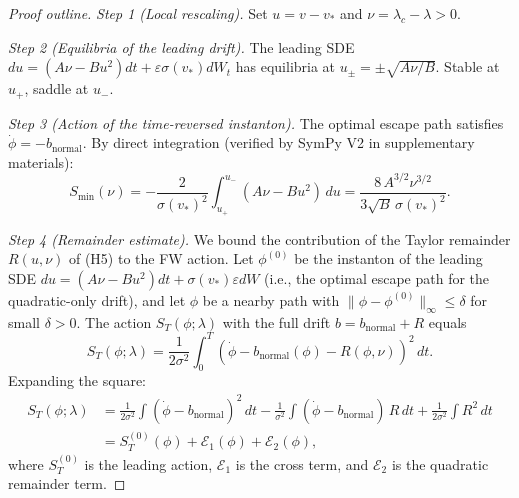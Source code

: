 \documentclass[11pt,a4paper]{article}
\theoremstyle{plain}
\theoremstyle{definition}
\newcommand{\eps}{\varepsilon}
\begin{document}
\begin{proof}[Proof outline]
\textit{Step 1 (Local rescaling).} Set $u = v - v_*$ and $\nu = \lambda_c - \lambda > 0$.

\textit{Step 2 (Equilibria of the leading drift).} The leading SDE $du = (A\nu - Bu^2)dt + \varepsilon\sigma(v_*)dW_t$ has equilibria at $u_\pm = \pm\sqrt{A\nu/B}$. Stable at $u_+$, saddle at $u_-$.

\textit{Step 3 (Action of the time-reversed instanton).} The optimal escape path satisfies $\dot\phi = -b_{\text{normal}}$. By direct integration (verified by SymPy V2 in supplementary materials):
\begin{equation*}
S_{\min}(\nu) = -\frac{2}{\sigma(v_*)^2}\int_{u_+}^{u_-}(A\nu - Bu^2)\,du = \frac{8\,A^{3/2}\nu^{3/2}}{3\sqrt B\,\sigma(v_*)^2}.
\end{equation*}

\textit{Step 4 (Remainder estimate).} We bound the contribution of the Taylor remainder $R(u,\nu)$ of (H5) to the FW action. Let $\phi^{(0)}$ be the instanton of the leading SDE $du = (A\nu - Bu^2)dt + \sigma(v_*)\eps dW$ (i.e., the optimal escape path for the quadratic-only drift), and let $\phi$ be a nearby path with $\|\phi - \phi^{(0)}\|_{\infty} \leq \delta$ for small $\delta > 0$. The action $S_T(\phi;\lambda)$ with the full drift $b = b_{\text{normal}} + R$ equals
$$S_T(\phi;\lambda) = \frac{1}{2\sigma^2}\int_0^T (\dot\phi - b_{\text{normal}}(\phi) - R(\phi,\nu))^2\,dt.$$
Expanding the square:
\begin{align*}
S_T(\phi;\lambda) &= \frac{1}{2\sigma^2}\int(\dot\phi - b_{\text{normal}})^2\,dt - \frac{1}{\sigma^2}\int(\dot\phi - b_{\text{normal}})\,R\,dt + \frac{1}{2\sigma^2}\int R^2\,dt\\
&= S_T^{(0)}(\phi) + \mathcal E_1(\phi) + \mathcal E_2(\phi),
\end{align*}
where $S_T^{(0)}$ is the leading action, $\mathcal E_1$ is the cross term, and $\mathcal E_2$ is the quadratic remainder term.


\end{proof}
\end{document}
